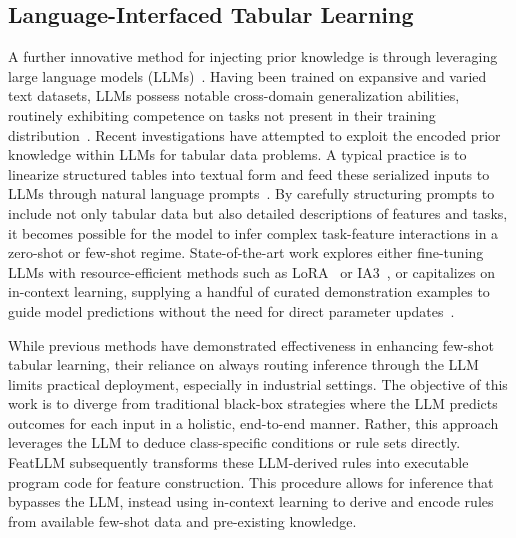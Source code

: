 \subsection{Language-Interfaced Tabular Learning} A further innovative method for injecting prior knowledge is through leveraging large language models (LLMs)~\cite{anil2023palm,openai2023gpt4}. Having been trained on expansive and varied text datasets, LLMs possess notable cross-domain generalization abilities, routinely exhibiting competence on tasks not present in their training distribution~\cite{brown2020language}. Recent investigations have attempted to exploit the encoded prior knowledge within LLMs for tabular data problems. A typical practice is to linearize structured tables into textual form and feed these serialized inputs to LLMs through natural language prompts~\cite{dinh2022lift,hegselmann2023tabllm,wang2023anypredict}. By carefully structuring prompts to include not only tabular data but also detailed descriptions of features and tasks, it becomes possible for the model to infer complex task-feature interactions in a zero-shot or few-shot regime. State-of-the-art work explores either fine-tuning LLMs with resource-efficient methods such as LoRA~\cite{hu2021lora} or IA3~\cite{liu2022few}, or capitalizes on in-context learning, supplying a handful of curated demonstration examples to guide model predictions without the need for direct parameter updates~\cite{dinh2022lift,hegselmann2023tabllm,nam2023semi,slack2023tablet}.

While previous methods have demonstrated effectiveness in enhancing few-shot tabular learning, their reliance on always routing inference through the LLM limits practical deployment, especially in industrial settings. The objective of this work is to diverge from traditional black-box strategies where the LLM predicts outcomes for each input in a holistic, end-to-end manner. Rather, this approach leverages the LLM to deduce class-specific conditions or rule sets directly. \textsf{FeatLLM} subsequently transforms these LLM-derived rules into executable program code for feature construction. This procedure allows for inference that bypasses the LLM, instead using in-context learning to derive and encode rules from available few-shot data and pre-existing knowledge.

